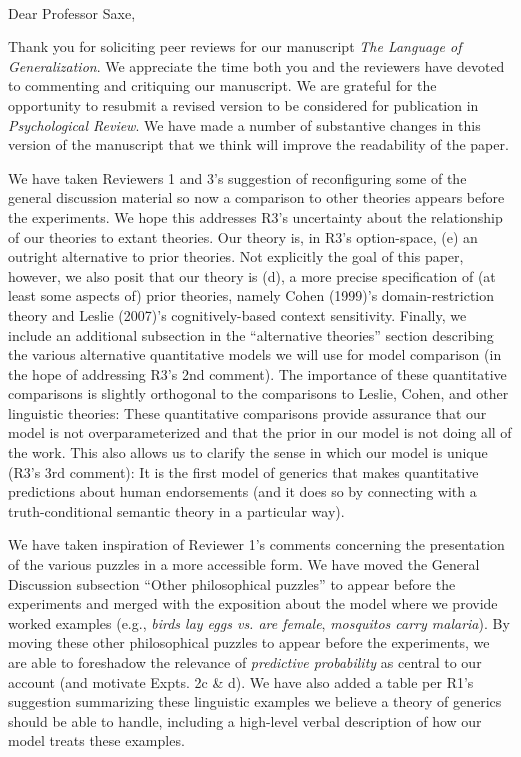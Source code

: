\documentclass[11pt,letterpaper]{letter} %
\def\opening#1{\thispagestyle{empty}
{\centering\fromaddress \vspace{0.6in} \\ %
\hspace*{\longindentation}\hspace*{\fill}\par} %
\vspace{0.4in} %
\noindent #1 %
}
\begin{document}
\begin{letter}

\opening{Dear Professor Saxe,}

Thank you for soliciting peer reviews for our manuscript \emph{The Language of Generalization}. We appreciate the time both you and the reviewers have devoted to commenting and critiquing our manuscript. We are grateful for the opportunity to resubmit a revised version to be considered for publication in \emph{Psychological Review}.
We have made a number of substantive changes in this version of the manuscript that we think will improve the readability of the paper.

We have taken Reviewers 1 and 3's suggestion of reconfiguring some of the general discussion material so now a comparison to other theories appears before the experiments.
We hope this addresses R3's uncertainty about the relationship of our theories to extant theories. 
Our theory is, in R3's option-space, (e) an outright alternative to prior theories. 
Not explicitly the goal of this paper, however,  we also posit that our theory is (d), a more precise specification of (at least some aspects of) prior theories, namely Cohen (1999)'s domain-restriction theory and Leslie (2007)'s cognitively-based context sensitivity. 
Finally, we include an additional subsection in the ``alternative theories'' section describing the various alternative quantitative models we will use for model comparison (in the hope of addressing R3's 2nd comment). 
The importance of these quantitative comparisons is slightly orthogonal to the comparisons to Leslie, Cohen, and other linguistic theories: These quantitative comparisons provide assurance that our  model is not overparameterized and that the prior in our model is not doing all of the work. 
This also allows us to clarify the sense in which our model is unique (R3's 3rd comment): It is the first model of generics that makes quantitative predictions about human endorsements (and it does so by connecting with a truth-conditional semantic theory in a particular way). 

We have taken inspiration of Reviewer 1's comments concerning the presentation of the various puzzles in a more accessible form. 
We have moved the General Discussion subsection ``Other philosophical puzzles'' to appear before the experiments and merged with the exposition about the model where we provide worked examples (e.g., \emph{birds lay eggs vs. are female}, \emph{mosquitos carry malaria}).
By moving these other philosophical puzzles to appear before the experiments, we are able to foreshadow the relevance of \emph{predictive probability} as central to our account (and motivate Expts. 2c \& d).
We have also added a table per R1's suggestion summarizing these linguistic examples we believe a theory of generics should be able to handle, including a high-level verbal description of how our model treats these examples. 


\end{letter}
\end{document}
